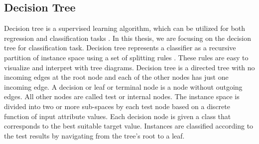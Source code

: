 \subsection{Decision Tree}\label{sec:DecTree}
Decision tree is a supervised learning algorithm, which can be utilized for both regression and classification tasks \cite{quinlan1986induction,BreiFrieStonOlsh84}. In this thesis, we are focusing on the decision tree for classification task. Decision tree represents a classifier as a recursive partition of instance space using a set of splitting rules \cite{quinlan1986induction,BreiFrieStonOlsh84}. These rules are easy to visualize and interpret with tree diagrams. Decision tree is a directed tree with no incoming edges at the root node and each of the other nodes has just one incoming edge. A decision or leaf or terminal node is a node without outgoing edges. All other nodes are called test or internal nodes. The instance space is divided into two or more sub-spaces by each test node based on a discrete function of input attribute values. Each decision node is given a class that corresponds to the best suitable target value. Instances are classified according to the test results by navigating from the tree's root to a leaf.

